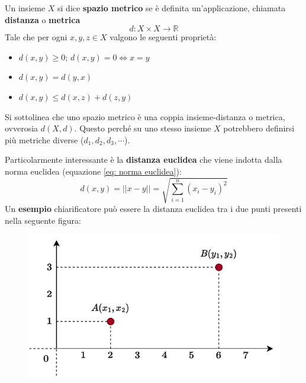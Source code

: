 \documentclass[a4paper]{article}
\newcommand{\example}[1]{\textcolor{Green4}{\textbf{#1}}}
\begin{document}
	\begin{boxdef}
		Un insieme $X$ si dice \textbf{spazio metrico} se è definita un'applicazione, chiamata \textbf{distanza} o \textbf{metrica}
		\begin{equation*}
			d: X \times X \rightarrow \mathbb{R}
		\end{equation*}
		Tale che per ogni $x,y,z \in X$ valgono le seguenti proprietà:
		\begin{itemize}
			\item $d\left(x,y\right) \ge 0$; \hspace{2em} $d\left(x,y\right) = 0 \iff x = y$
			
			\item $d\left(x,y\right) = d\left(y,x\right)$
			
			\item $d\left(x,y\right) \le d\left(x,z\right) + d\left(z,y\right)$
		\end{itemize}
	\end{boxdef}

	\noindent
	Si sottolinea che uno spazio metrico è una coppia insieme-distanza o metrica, ovverosia $d\left(X, d\right)$. Questo perché su uno stesso insieme $X$ potrebbero definirsi più metriche diverse ($d_{1}, d_{2}, d_{3}, \cdots$).\newline

	\noindent
	Particolarmente interessante è la \textbf{distanza euclidea} che viene indotta dalla norma euclidea (equazione \ref{eq: norma euclidea}):
	\begin{equation}\label{eq: distanza euclidea}
		d\left(x,y\right) = ||x-y|| = \sqrt{\displaystyle\sum_{i=1}^{n}\left(x_{i} - y_{i}\right)^{2}}
	\end{equation}
	Un \example{esempio} chiarificatore può essere la distanza euclidea tra i due punti presenti nella seguente figura:
	\begin{figure}[!htp]
		\centering
		\includegraphics[width=.8\textwidth]{img/distanza_euclidea.pdf}
	\end{figure}
	
\end{document}
